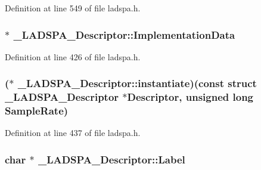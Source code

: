 Definition at line 549 of file ladspa.\+h.

\subsubsection[{\texorpdfstring{Implementation\+Data}{ImplementationData}}]{ $\ast$ \+\_\+\+L\+A\+D\+S\+P\+A\+\_\+\+Descriptor\+::\+Implementation\+Data}\hypertarget{struct___l_a_d_s_p_a___descriptor_a6ca8b79996cc9fd26c8d630a94b9d9cf}{}\label{struct___l_a_d_s_p_a___descriptor_a6ca8b79996cc9fd26c8d630a94b9d9cf}


Definition at line 426 of file ladspa.\+h.

\subsubsection[{\texorpdfstring{instantiate}{instantiate}}]{($\ast$ \+\_\+\+L\+A\+D\+S\+P\+A\+\_\+\+Descriptor\+::instantiate)({\bf const} struct {\bf \+\_\+\+L\+A\+D\+S\+P\+A\+\_\+\+Descriptor} $\ast$Descriptor, unsigned long Sample\+Rate)}\hypertarget{struct___l_a_d_s_p_a___descriptor_aca162cd242c75b0a82b44b3c74f8c2cf}{}\label{struct___l_a_d_s_p_a___descriptor_aca162cd242c75b0a82b44b3c74f8c2cf}


Definition at line 437 of file ladspa.\+h.

\subsubsection[{\texorpdfstring{Label}{Label}}]{ char $\ast$ \+\_\+\+L\+A\+D\+S\+P\+A\+\_\+\+Descriptor\+::\+Label}\hypertarget{struct___l_a_d_s_p_a___descriptor_afbd2609738f6fe55bb31701371363516}{}\label{struct___l_a_d_s_p_a___descriptor_afbd2609738f6fe55bb31701371363516}


